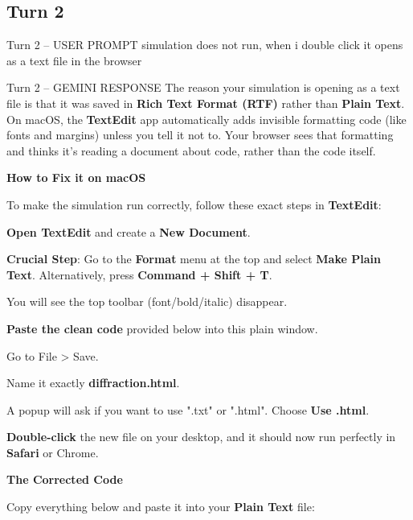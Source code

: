 \documentclass[10pt,a4paper]{article}
\begin{document}
\subsection*{Turn 2}
\begin{userbox}{Turn 2 -- USER PROMPT}
simulation does not run, when i double click it opens as a text file in the browser
\end{userbox}

\begin{aibox}{Turn 2 -- GEMINI RESPONSE}
The reason your simulation is opening as a text file is that it was saved in \textbf{Rich Text Format (RTF)} rather than \textbf{Plain Text}. On macOS, the \textbf{TextEdit} app automatically adds invisible formatting code (like fonts and margins) unless you tell it not to. Your browser sees that formatting and thinks it's reading a document about code, rather than the code itself.

\textbf{\large How to Fix it on macOS}

To make the simulation run correctly, follow these exact steps in \textbf{TextEdit}:

\textbf{Open TextEdit} and create a \textbf{New Document}.

\textbf{Crucial Step}: Go to the \textbf{Format} menu at the top and select \textbf{Make Plain Text}. Alternatively, press \textbf{Command + Shift + T}.

You will see the top toolbar (font/bold/italic) disappear.

\textbf{Paste the clean code} provided below into this plain window.

Go to File > Save.

Name it exactly \textbf{diffraction.html}.

A popup will ask if you want to use ".txt" or ".html". Choose \textbf{Use .html}.

\textbf{Double-click} the new file on your desktop, and it should now run perfectly in \textbf{Safari} or Chrome.

\textbf{The Corrected Code}

Copy everything below and paste it into your \textbf{Plain Text} file:

\end{aibox}
\end{document}
